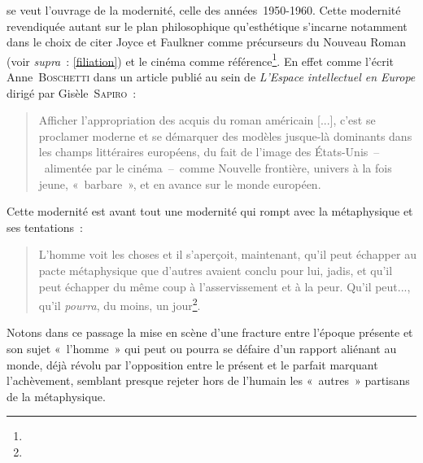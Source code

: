 \punr{} se veut l'ouvrage de la modernité, celle des années~1950-1960. Cette modernité revendiquée autant sur le plan philosophique qu'esthétique s'incarne notamment dans le choix de citer Joyce et Faulkner comme précurseurs du Nouveau Roman (voir \textit{supra}~: \ref{filiation}) et le cinéma comme référence\footnote{}. En effet comme l'écrit Anne~\textsc{Boschetti} dans un article publié au sein de \textit{L'Espace intellectuel en Europe} dirigé par Gisèle~\textsc{Sapiro}~:
\begin{quote}
    Afficher l’appropriation des acquis du roman américain [...], c’est se proclamer moderne et se démarquer des modèles jusque-là dominants dans les champs littéraires européens, du fait de l’image des États-Unis~–~alimentée par le cinéma~–~comme Nouvelle frontière, univers à la fois jeune, «~barbare~», et en avance sur le monde européen\inte.
\end{quote}
Cette modernité est avant tout une modernité qui rompt avec la métaphysique et ses tentations~:
\begin{quote}
    L’homme voit les choses et il s’aperçoit, maintenant, qu’il peut échapper au pacte métaphysique que d’autres avaient conclu pour lui, jadis, et qu’il peut échapper du même coup à l’asservissement et à la peur. Qu’il peut..., qu’il \textit{pourra}, du moins, un jour\footnote{}.
\end{quote}
Notons dans ce passage la mise en scène d'une fracture entre l'époque présente et son sujet «~l'homme~» qui peut ou pourra se défaire d'un rapport aliénant au monde, déjà révolu par l'opposition entre le présent et le parfait marquant l'achèvement, semblant presque rejeter hors de l'humain les «~autres~» partisans de la métaphysique.

